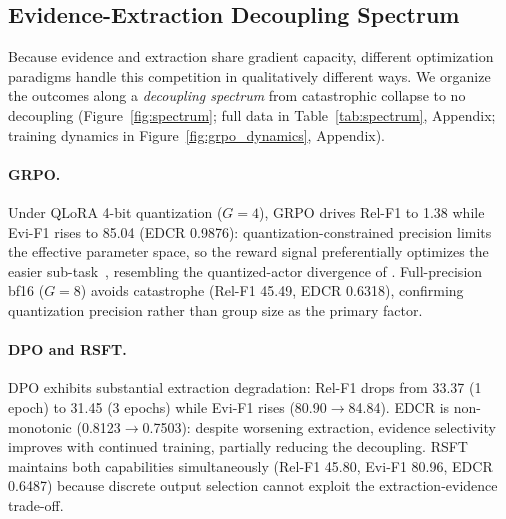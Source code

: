 \begin{table}[t]
\centering
\caption{Main results on DocRED dev (Qwen3-4B). Ign-F1 shows mean $\pm$ std$^{(\text{seeds})}$; other metrics are same-seed means. Best \textbf{bold}; best evidence-generating \underline{underlined}. Per-seed: Appendix~\ref{tab:ablation_full}.}
\label{tab:main}
\small
{}
\vspace{-2mm}
\end{table}


\subsection{Evidence-Extraction Decoupling Spectrum}
\label{sec:spectrum}

Because evidence and extraction share gradient capacity, different optimization paradigms handle this competition in qualitatively different ways. We organize the outcomes along a \emph{decoupling spectrum} from catastrophic collapse to no decoupling (Figure~\ref{fig:spectrum}; full data in Table~\ref{tab:spectrum}, Appendix; training dynamics in Figure~\ref{fig:grpo_dynamics}, Appendix).

\paragraph{GRPO.}
Under QLoRA 4-bit quantization ($G{=}4$), GRPO drives Rel-F1 to 1.38 while Evi-F1 rises to 85.04 (EDCR 0.9876): quantization-constrained precision limits the effective parameter space, so the reward signal preferentially optimizes the easier sub-task~\citep{gao2023scaling}, resembling the quantized-actor divergence of \citet{li2026qurl}. Full-precision bf16 ($G{=}8$) avoids catastrophe (Rel-F1 45.49, EDCR 0.6318), confirming quantization precision rather than group size as the primary factor.

\paragraph{DPO and RSFT.}
DPO exhibits substantial extraction degradation: Rel-F1 drops from 33.37 (1 epoch) to 31.45 (3 epochs) while Evi-F1 rises (80.90$\to$84.84). EDCR is non-monotonic (0.8123$\to$0.7503): despite worsening extraction, evidence selectivity improves with continued training, partially reducing the decoupling. RSFT maintains both capabilities simultaneously (Rel-F1 45.80, Evi-F1 80.96, EDCR 0.6487) because discrete output selection cannot exploit the extraction-evidence trade-off.

